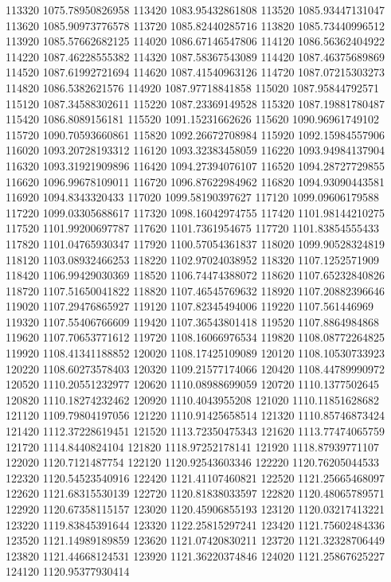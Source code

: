 {113320 1075.78950826958
113420 1083.95432861808
113520 1085.93447131047
113620 1085.90973776578
113720 1085.82440285716
113820 1085.73440996512
113920 1085.57662682125
114020 1086.67146547806
114120 1086.56362404922
114220 1087.46228555382
114320 1087.58367543089
114420 1087.46375689869
114520 1087.61992721694
114620 1087.41540963126
114720 1087.07215303273
114820 1086.5382621576
114920 1087.97718841858
115020 1087.95844792571
115120 1087.34588302611
115220 1087.23369149528
115320 1087.19881780487
115420 1086.8089156181
115520 1091.15231662626
115620 1090.96961749102
115720 1090.70593660861
115820 1092.26672708984
115920 1092.15984557906
116020 1093.20728193312
116120 1093.32383458059
116220 1093.94984137904
116320 1093.31921909896
116420 1094.27394076107
116520 1094.28727729855
116620 1096.99678109011
116720 1096.87622984962
116820 1094.93090443581
116920 1094.8343320433
117020 1099.58190397627
117120 1099.09606179588
117220 1099.03305688617
117320 1098.16042974755
117420 1101.98144210275
117520 1101.99200697787
117620 1101.7361954675
117720 1101.83854555433
117820 1101.04765930347
117920 1100.57054361837
118020 1099.90528324819
118120 1103.08932466253
118220 1102.97024038952
118320 1107.1252571909
118420 1106.99429030369
118520 1106.74474388072
118620 1107.65232840826
118720 1107.51650041822
118820 1107.46545769632
118920 1107.20882396646
119020 1107.29476865927
119120 1107.82345494006
119220 1107.561446969
119320 1107.55406766609
119420 1107.36543801418
119520 1107.8864984868
119620 1107.70653771612
119720 1108.16066976534
119820 1108.08772264825
119920 1108.41341188852
120020 1108.17425109089
120120 1108.10530733923
120220 1108.60273578403
120320 1109.21577174066
120420 1108.44789990972
120520 1110.20551232977
120620 1110.08988699059
120720 1110.1377502645
120820 1110.18274232462
120920 1110.4043955208
121020 1110.11851628682
121120 1109.79804197056
121220 1110.91425658514
121320 1110.85746873424
121420 1112.37228619451
121520 1113.72350475343
121620 1113.77474065759
121720 1114.8440824104
121820 1118.97252178141
121920 1118.87939771107
122020 1120.7121487754
122120 1120.92543603346
122220 1120.76205044533
122320 1120.54523540916
122420 1121.41107460821
122520 1121.25665468097
122620 1121.68315530139
122720 1120.81838033597
122820 1120.48065789571
122920 1120.67358115157
123020 1120.45906855193
123120 1120.03217413221
123220 1119.83845391644
123320 1122.25815297241
123420 1121.75602484336
123520 1121.14989189859
123620 1121.07420830211
123720 1121.32328706449
123820 1121.44668124531
123920 1121.36220374846
124020 1121.25867625227
124120 1120.95377930414
}
